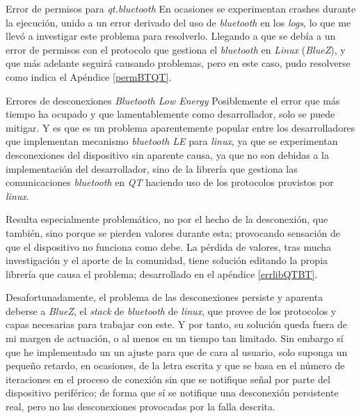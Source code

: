 \begin{problemas}{Error de permisos para \textit{qt.bluetooth}}
    \color{mitexto}
    En ocasiones se experimentan crashes durante la ejecución,
    unido a un error derivado del uso de \textit{bluetooth} en los \textit{logs},
    lo que me llevó
    a investigar este problema para resolverlo. Llegando
    a que se debía a un error de permisos con el protocolo
    que gestiona el \textit{bluetooth} en \textit{Linux} (\textit{BlueZ}),
    y que más adelante seguirá causando problemas, pero en este caso, pudo
    resolverse como indica el Apéndice \ref{permBTQT}.
\end{problemas}

\begin{problemas}{Errores de desconexiones \textit{Bluetooth Low Energy}\label{errDescBT}}
    \color{mitexto}
    Posiblemente el error que más tiempo ha ocupado y que lamentablemente
    como desarrollador, solo se puede mitigar. Y es que es un problema
    aparentemente popular entre los desarrolladores que implementan 
    mecanismo \textit{bluetooth LE} para \textit{linux}, ya que se experimentan
    desconexiones del dispositivo sin aparente causa, ya que no son debidas
    a la implementación del desarrollador, sino de la librería que gestiona
    las comunicaciones \textit{bluetooth} en \textit{QT} haciendo uso de los
    protocolos provistos por \textit{linux}.

    Resulta especialmente problemático, no por el hecho de la desconexión,
    que también, sino porque se pierden valores durante esta; provocando
    sensación de que el dispositivo no funciona como debe. La pérdida de
    valores, tras mucha investigación y el aporte de la comunidad, tiene
    solución editando la propia librería que causa el problema;
    desarrollado en el apéndice \ref{errlibQTBT}.
    
    Desafortunadamente,
    el problema de las desconexiones persiste y aparenta deberse a
    \textit{BlueZ}, el \textit{stack} de \textit{bluetooth} de \textit{linux},
    que provee de los protocolos y capas necesarias para trabajar con este.
    Y por tanto, su solución queda fuera de mi margen de actuación, o al
    menos en un tiempo tan limitado. Sin embargo sí que he implementado un
    un ajuste para que de cara al usuario, solo suponga un pequeño retardo,
    en ocasiones, de la letra escrita y que se basa en el número de iteraciones
    en el proceso de conexión sin que se notifique señal por parte del
    dispositivo periférico; de forma que sí se notifique una desconexión
    persistente real, pero no las desconexiones provocadas por la falla
    descrita.
\end{problemas}

